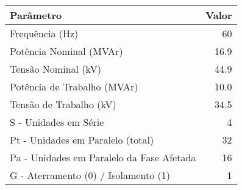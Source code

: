 \begin{tabular}{|l|r|}
\hline
\textbf{Parâmetro} & \textbf{Valor} \\ \hline
Frequência (Hz) & 60 \\  \hline
Potência Nominal (MVAr) & 16.9 \\  \hline
Tensão Nominal (kV) & 44.9 \\  \hline
Potência de Trabalho (MVAr) & 10.0 \\  \hline
Tensão de Trabalho (kV) & 34.5 \\  \hline
S  - Unidades em Série & 4 \\  \hline
Pt - Unidades em Paralelo (total) & 32 \\  \hline
Pa - Unidades em Paralelo da Fase Afetada & 16 \\  \hline
G  - Aterramento (0) / Isolamento (1) & 1 \\  \hline
\end{tabular}